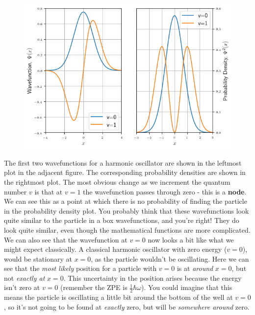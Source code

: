 \documentclass{memoir}[11pt,oneside,a4paper,openany]
\begin{document}
\begin{figure}
	\centering
	\includegraphics[width=\linewidth]{harmonic_oscillator_wf}
\end{figure}
The first two wavefunctions for a harmonic oscillator are shown in the leftmost plot in the adjacent figure. The corresponding probability densities are shown in the rightmost plot. The most obvious change as we increment the quantum number $v$ is that at $v=1$ the wavefunction passes through zero - this is a \textbf{node}. We can see this as a point at which there is no probability of finding the particle in the probability density plot. You probably think that these wavefunctions look quite similar to the particle in a box wavefunctions, and you're right! They do look quite similar, even though the mathematical functions are more complicated. We can also see that the wavefunction at $v=0$ now looks a bit like what we might expect classically. A classical harmonic oscillator with zero energy ($v=0$), would be stationary at $x=0$, as the particle wouldn't be oscillating. Here we can see that the \emph{most likely} position for a particle with $v=0$ is at \emph{around} $x=0$, but not \emph{exactly at} $x=0$. This uncertainty in the position arises because the energy isn't zero at $v=0$ (remember the ZPE is $\frac{1}{2}\hbar\omega$). You could imagine that this means the particle is oscillating a little bit around the bottom of the well at $v=0$, so it's not going to be found at \emph{exactly} zero, but will be \emph{somewhere around} zero.
\end{document}
